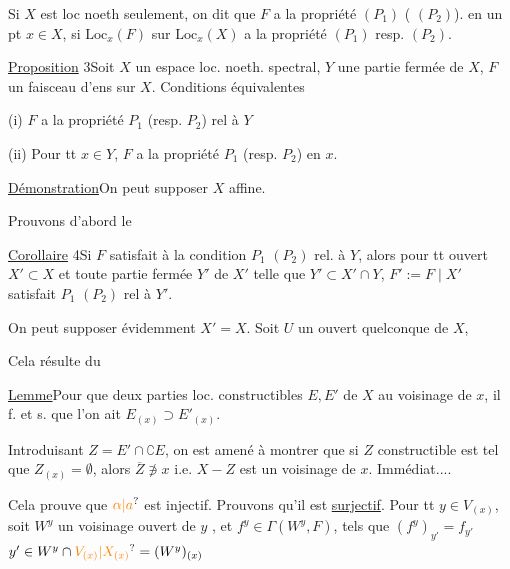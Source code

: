 
Si $X$ est loc noeth  seulement, on dit que $F$ a la propriété $(P_1)$ ( $(P_2)$). en un pt $x\in X$, si $\mathrm{Loc}_x(F)$ sur $\mathrm{Loc}_x(X)$ a la propriété $(P_1)$ resp. $(P_2)$.

\uline{Proposition} 3\quad Soit $X$ un espace loc. noeth. spectral, $Y$ une partie fermée de $X$, $F$ un faisceau d'ens sur $X$. Conditions équivalentes

(i) $F$ a la propriété $P_1$ (resp. $P_2$) rel à $Y$

(ii) Pour tt $x\in Y$, $F$ a la propriété $P_1$ (resp. $P_2$) en $x$.

\uline{Démonstration}\quad On peut supposer $X$ affine.

 Prouvons d'abord le

\uline{Corollaire} 4\quad Si $F$ satisfait à la condition $P_1$ $(P_2)$ rel. à $Y$, alors pour tt ouvert $X'\subset X$ et toute partie fermée $Y'$ de $X'$ telle que $Y'\subset X'\cap Y$, $F':=F\mid X'$ satisfait $P_1$ $(P_2)$ rel à $Y'$.


 On peut supposer évidemment $X'=X$. Soit $U$ un ouvert quelconque de $X$,


 Cela résulte du

\uline{Lemme}\quad Pour que deux parties loc. constructibles $E,E'$ de $X$   au voisinage de $x$, il f. et s. que  l'on ait $E_{(x)}\supset E'_{(x)}$.

Introduisant  $Z=E'\cap\complement E$, on est amené à montrer que si $Z$ constructible est tel que $Z_{(x)}=\emptyset$, alors $\overline Z\not\ni x$ i.e. $X-Z$ est un voisinage de $x$. Immédiat....

Cela prouve que $\unsure{\alpha|a}$ est injectif. Prouvons qu'il est \uline{surjectif}.  Pour tt $y\in V_{(x)}$, soit $W^y$ un voisinage ouvert de $y$ , et $f^y\in\Gamma(W^y,F)$, tels que $(f^y)_{y'}=f_{y'}$  $y'\in W^y\cap \unsure{V_{(x)}|X_{(x)}}=(W^y)_{(x)}$

